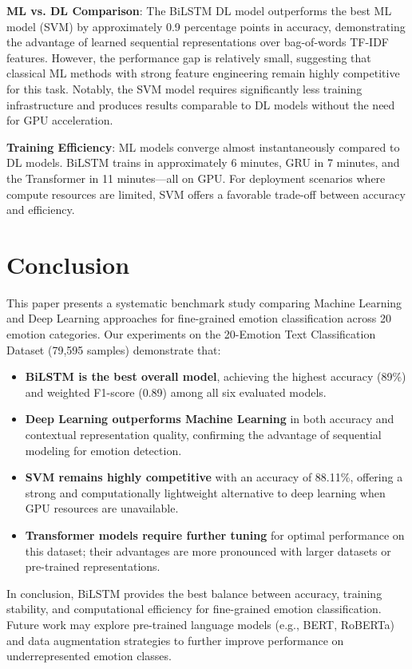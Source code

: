 \documentclass{article}
\begin{document}
\textbf{ML vs. DL Comparison}: The BiLSTM DL model outperforms the best ML model (SVM) by approximately 0.9 percentage points in accuracy, demonstrating the advantage of learned sequential representations over bag-of-words TF-IDF features. However, the performance gap is relatively small, suggesting that classical ML methods with strong feature engineering remain highly competitive for this task. Notably, the SVM model requires significantly less training infrastructure and produces results comparable to DL models without the need for GPU acceleration.

\textbf{Training Efficiency}: ML models converge almost instantaneously compared to DL models. BiLSTM trains in approximately 6 minutes, GRU in 7 minutes, and the Transformer in 11 minutes—all on GPU. For deployment scenarios where compute resources are limited, SVM offers a favorable trade-off between accuracy and efficiency.

\section{Conclusion}

This paper presents a systematic benchmark study comparing Machine Learning and Deep Learning approaches for fine-grained emotion classification across 20 emotion categories. Our experiments on the 20-Emotion Text Classification Dataset (79,595 samples) demonstrate that:

\begin{itemize}
\item \textbf{BiLSTM is the best overall model}, achieving the highest accuracy (89\%) and weighted F1-score (0.89) among all six evaluated models.
\item \textbf{Deep Learning outperforms Machine Learning} in both accuracy and contextual representation quality, confirming the advantage of sequential modeling for emotion detection.
\item \textbf{SVM remains highly competitive} with an accuracy of 88.11\%, offering a strong and computationally lightweight alternative to deep learning when GPU resources are unavailable.
\item \textbf{Transformer models require further tuning} for optimal performance on this dataset; their advantages are more pronounced with larger datasets or pre-trained representations.
\end{itemize} %

In conclusion, BiLSTM provides the best balance between accuracy, training stability, and computational efficiency for fine-grained emotion classification. Future work may explore pre-trained language models (e.g., BERT, RoBERTa) and data augmentation strategies to further improve performance on underrepresented emotion classes.



\end{document}
